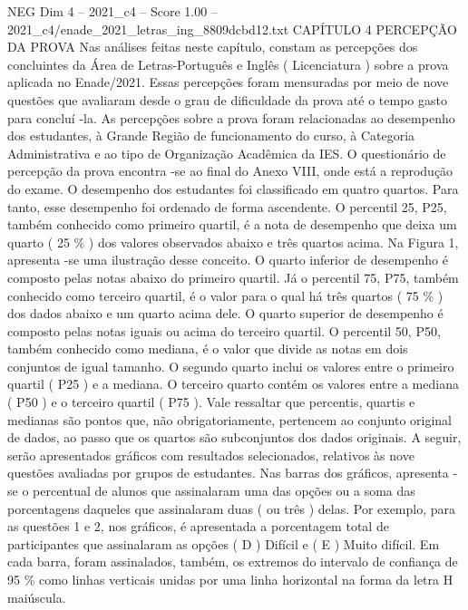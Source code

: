\begin{textsample}{NEG Dim 4 – 2021\_c4 – Score 1.00 – 2021\_c4/enade\_2021\_letras\_ing\_8809dcbd12.txt}  \label{ex:f4_neg_226}
CAPÍTULO 4 PERCEPÇÃO DA PROVA Nas análises feitas neste capítulo, constam as percepções dos concluintes da Área de Letras-Português e Inglês ( Licenciatura ) sobre a prova aplicada no Enade/2021.
Essas percepções foram mensuradas por meio de nove questões que avaliaram desde o grau de dificuldade da prova até o tempo gasto para concluí -la.
As percepções sobre a prova foram relacionadas ao desempenho dos estudantes, à Grande Região de funcionamento do curso, à Categoria Administrativa e ao tipo de Organização Acadêmica da IES.
O questionário de percepção da prova encontra -se ao final do Anexo VIII, onde está a reprodução do exame.
O desempenho dos estudantes foi classificado em quatro quartos.
Para tanto, esse desempenho foi ordenado de forma ascendente.
O percentil 25, P25, também conhecido como primeiro quartil, é a nota de desempenho que deixa um quarto ( 25 \% ) dos valores observados abaixo e três quartos acima.
Na Figura 1, apresenta -se uma ilustração desse conceito.
O quarto inferior de desempenho é composto pelas notas abaixo do primeiro quartil.
Já o percentil 75, P75, também conhecido como terceiro quartil, é o valor para o qual há três quartos ( 75 \% ) dos dados abaixo e um quarto acima dele.
O quarto superior de desempenho é composto pelas notas iguais ou acima do terceiro quartil.
O percentil 50, P50, também conhecido como mediana, é o valor que divide as notas em dois conjuntos de igual tamanho.
O segundo quarto inclui os valores entre o primeiro quartil ( P25 ) e a mediana.
O terceiro quarto contém os valores entre a mediana ( P50 ) e o terceiro quartil ( P75 ).
Vale ressaltar que percentis, quartis e medianas são pontos que, não obrigatoriamente, pertencem ao conjunto original de dados, ao passo que os quartos são subconjuntos dos dados originais.
A seguir, serão apresentados gráficos com resultados selecionados, relativos às nove questões avaliadas por grupos de estudantes.
Nas barras dos gráficos, apresenta -se o percentual de alunos que assinalaram uma das opções ou a soma das porcentagens daqueles que assinalaram duas ( ou três ) delas.
Por exemplo, para as questões 1 e 2, nos gráficos, é apresentada a porcentagem total de participantes que assinalaram as opções ( D ) Difícil e ( E ) Muito difícil.
Em cada barra, foram assinalados, também, os extremos do intervalo de confiança de 95 \% como linhas verticais unidas por uma linha horizontal na forma da letra H maiúscula.

\end{textsample}
